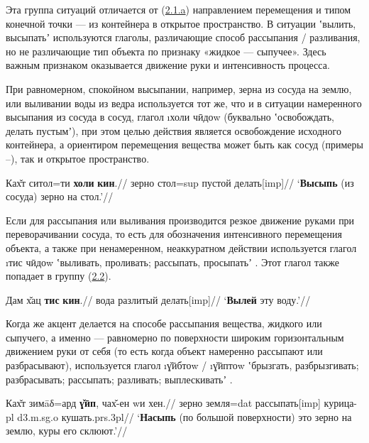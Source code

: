 Эта группа ситуаций отличается от (\hyperref[pour-21a]{2.1.a}) направлением перемещения и типом конечной точки — из контейнера в открытое пространство. В ситуации ʽвылить, высыпатьʼ используются глаголы, различающие способ рассыпания / разливания, но не различающие тип объекта по признаку «жидкое — сыпучее». Здесь важным признаком оказывается движение руки и интенсивность процесса.

При равномерном, спокойном высыпании, например, зерна из сосуда на землю, или выливании воды из ведра используется тот же, что и в ситуации намеренного высыпания из сосуда в сосуд, глагол \i{холи чӣдоw} (буквально ʽосвобождать, делать пустымʼ), при этом целью действия является освобождение исходного контейнера, а ориентиром перемещения вещества может быть как сосуд (примеры –), так и открытое пространство.

\begingl
\gla Ках̌т ситол=ти \textbf{холи} \textbf{кин}.//
\glc зерно стол={\sc sup} пустой делать[{\sc imp}]//
\glft ‘\textbf{Высыпь} (из сосуда) зерно на стол.’//
\endgl \xe

Если для рассыпания или выливания производится резкое движение руками при переворачивании сосуда, то есть для обозначения интенсивного перемещения объекта, а также при ненамеренном, неаккуратном действии используется глагол \i{тис чӣдоw} ʽвыливать, проливать; рассыпать, просыпатьʼ \parencite[82]{karamshoev1999}. Этот глагол также попадает в группу (\hyperref[pour-22]{2.2}).

\begingl
\gla Дам х̌ац \textbf{тис} \textbf{кин}.//
 вода разлитый делать[{\sc imp}]//
\glft ‘\textbf{Вылей} эту воду.’//
\endgl \xe

Когда же акцент делается на способе рассыпания вещества, жидкого или сыпучего, а именно — равномерно по поверхности широким горизонтальным движением руки от себя (то есть когда объект намеренно рассыпают или разбрасывают), используется глагол \i{ɣ̌ӣбтоw} / \i{ɣ̌ӣптоw} ʽбрызгать, разбрызгивать; разбрасывать; рассыпать; разливать; выплескиватьʼ \parencite[483–484]{karamshoev1999}.

\begingl
\gla Ках̌т зимāδ=ард \textbf{ɣ̌ӣп}, чах̌-ен wи хен.//
\glc зерно земля={\sc dat} рассыпать[{\sc imp}] курица-{\sc pl} {\sc d3.m.sg.o} кушать.{\sc prs.3pl}//
\glft ‘\textbf{Насыпь} (по большой поверхности) это зерно на землю, куры его склюют.’//
\endgl \xe

